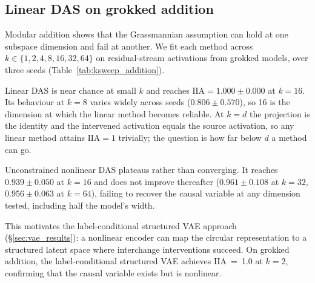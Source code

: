 \documentclass{article}
\newcommand{\IIA}{\mathrm{IIA}}
\begin{document}
\subsection{Linear DAS on grokked addition}
\label{sec:linear_das_fails}

Modular addition shows that the Grassmannian assumption can hold at one
subspace dimension and fail at another. We fit each method across
$k \in \{1, 2, 4, 8, 16, 32, 64\}$ on residual-stream activations from grokked
models, over three seeds (Table~\ref{tab:ksweep_addition}).

Linear DAS is near chance at small $k$ and reaches $\IIA = 1.000 \pm 0.000$ at
$k = 16$. Its behaviour at $k = 8$ varies widely across seeds
($0.806 \pm 0.570$), so 16 is the dimension at which the linear method becomes
reliable. At $k = d$ the projection is the identity and the intervened activation
equals the source activation, so any linear method attains $\IIA = 1$ trivially;
the question is how far below $d$ a method can go.

Unconstrained nonlinear DAS plateaus rather than converging. It reaches
$0.939 \pm 0.050$ at $k = 16$ and does not improve thereafter
($0.961 \pm 0.108$ at $k = 32$, $0.956 \pm 0.063$ at $k = 64$), failing to
recover the causal variable at any dimension tested, including half the model's
width.

This motivates the label-conditional structured VAE approach (\S\ref{sec:vae_results}):
a nonlinear encoder can map the circular representation to a structured
latent space where interchange interventions succeed. On grokked addition, the
label-conditional structured VAE achieves IIA~=~1.0 at $k{=}2$, confirming that the causal
variable exists but is nonlinear.
\end{document}
